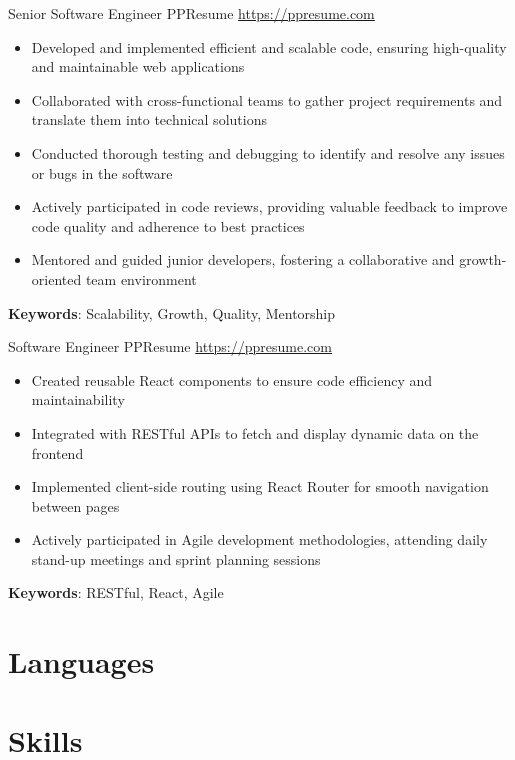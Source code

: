 \documentclass[a4paper, serif, 10pt]{moderncv}
\begin{document}
        {Senior Software Engineer}
        {PPResume}
        {\url{https://ppresume.com}}
        {}
        {\begin{itemize}
\item Developed and implemented efficient and scalable code, ensuring high-quality and maintainable web applications
\item Collaborated with cross-functional teams to gather project requirements and translate them into technical solutions
\item Conducted thorough testing and debugging to identify and resolve any issues or bugs in the software
\item Actively participated in code reviews, providing valuable feedback to improve code quality and adherence to best practices
\item Mentored and guided junior developers, fostering a collaborative and growth-oriented team environment
\end{itemize}
\textbf{Keywords}: Scalability, Growth, Quality, Mentorship}

        {Software Engineer}
        {PPResume}
        {\url{https://ppresume.com}}
        {}
        {\begin{itemize}
\item Created reusable React components to ensure code efficiency and maintainability
\item Integrated with RESTful APIs to fetch and display dynamic data on the frontend
\item Implemented client-side routing using React Router for smooth navigation between pages
\item Actively participated in Agile development methodologies, attending daily stand-up meetings and sprint planning sessions
\end{itemize}
\textbf{Keywords}: RESTful, React, Agile}
\section{Languages}

\section{Skills}

\end{document}
